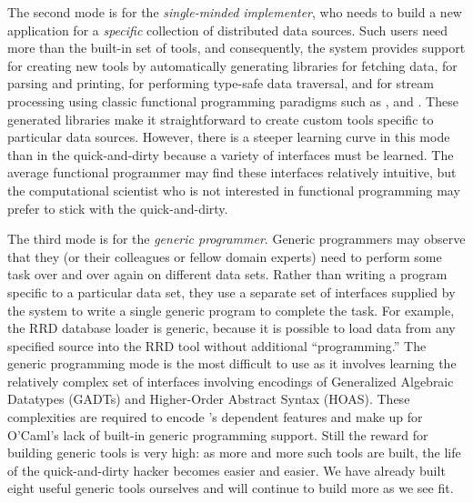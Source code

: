 The second mode is
for the {\em single-minded implementer}, who needs to build a new
application for a {\em specific} collection of distributed data
sources.  Such users need more than the built-in set of tools, 
and consequently, the system provides support for
creating new tools by automatically generating libraries for fetching
data, for parsing and printing, for performing type-safe data
traversal, and for stream processing using classic functional
programming paradigms such as ,  and .
These generated libraries make it straightforward to create custom tools
specific to particular data sources.  However, there is a steeper learning
curve in this mode than in the quick-and-dirty because a variety of
interfaces must be learned.  The average functional programmer may find
these interfaces relatively intuitive, but the computational scientist
who is not interested in functional programming may prefer to stick with
the quick-and-dirty. 

The third mode is for the {\em generic programmer}.  Generic
programmers may observe that they (or their colleagues or fellow domain
experts) need to perform some task over and over again on different
data sets.  Rather than writing a program specific to a particular
data set, they use a 
separate set of interfaces supplied by the \padsd{} system to write a
single generic program to complete the task.  For example, the RRD database
loader is generic, because it is possible to load data from any
specified source into the RRD tool without additional ``programming.''
The generic programming mode is the most difficult to use as it involves
learning the relatively complex set of interfaces involving encodings
of Generalized Algebraic Datatypes (GADTs) and Higher-Order Abstract Syntax 
(HOAS).  These complexities are required to encode \padsd{}'s dependent features and make up for O'Caml's lack of built-in generic programming support.
Still the reward for building generic tools is very high:
as more and more such tools are built, the life of the quick-and-dirty
hacker becomes easier and easier.  We have already built eight useful
generic tools ourselves and will continue to build more as we see fit.



